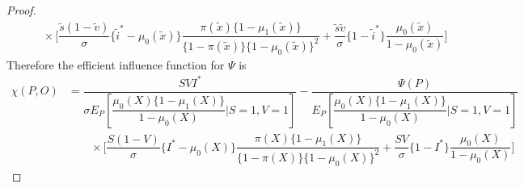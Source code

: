 \begin{appendix}
\begin{proof}
\begin{align*}
    &\qquad \times \bigg[ \dfrac{\tilde s(1 - \tilde v)}{\sigma}\{\tilde i^* - \mu_0(\tilde x)\}\dfrac{\pi(\tilde x)\{1 - \mu_1(\tilde x)\}}{\{1 - \pi(\tilde x)\}\{1 - \mu_0(\tilde x)\}^2} + \dfrac{\tilde s \tilde v}{\sigma}\{1-\tilde i^*\}\dfrac{\mu_0(\tilde x)}{1 - \mu_0(\tilde x)}\bigg]
\end{align*}
Therefore the efficient influence function for $\Psi$ is 
\begin{align*}
     \chi(P, O) &= \dfrac{S V I^*}{\sigma E_P\left[\dfrac{\mu_0(X)\{1 - \mu_1(X)\}}{1 - \mu_0(X)} \bigg| S=1, V=1\right]} - \dfrac{\Psi(P)}{E_P\left[\dfrac{\mu_0(X)\{1 - \mu_1(X)\}}{1 - \mu_0(X)}\bigg| S=1, V=1\right]} \\
    &\qquad \times \bigg[ \dfrac{S(1 - V)}{\sigma}\{I^* - \mu_0(X)\}\dfrac{\pi(X)\{1 - \mu_1(X)\}}{\{1 - \pi(X)\}\{1 - \mu_0(X)\}^2} + \dfrac{S V}{\sigma}\{1-I^*\}\dfrac{\mu_0(X)}{1 - \mu_0(X)}\bigg] 
\end{align*}
    \end{proof}

    



\end{appendix}
